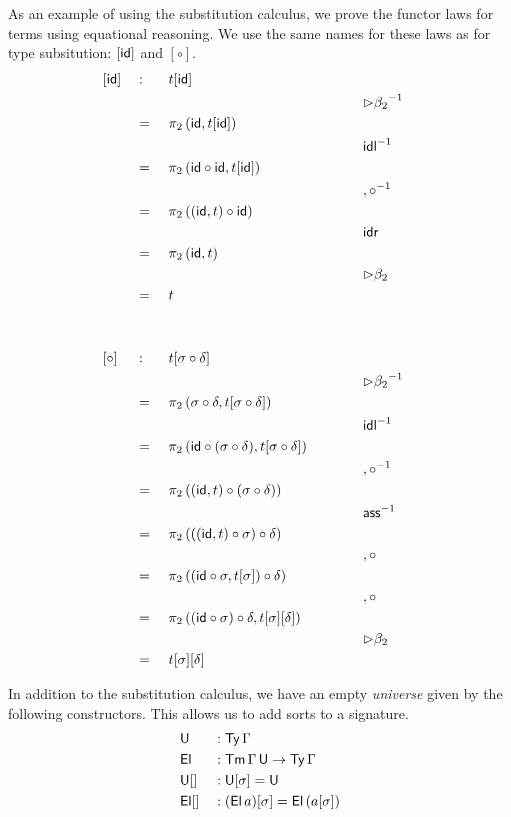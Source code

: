 \documentclass[acmsmall,screen]{acmart}
\begin{document}
As an example of using the substitution calculus, we prove the functor
laws for terms using equational reasoning. We use the same names for
these laws as for type subsitution: ${[\mathsf{id}]}$ and ${[\circ]}$.
\begin{alignat*}{15}
  & [\id] && : && t[\id] \\
  & && && && && {\rhd\beta_2}^{-1} \\
  & && = \,\, && \pi_2\,(\id, t[\id]) \\
  & && && && && {\idl}^{-1} \\
  & && = \,\, && \pi_2\,(\id\circ\id, t[\id]) \\
  & && && && && {,\circ}^{-1} \\
  & && = \,\, && \pi_2\,((\id, t)\circ\id) \\
  & && && && && \idr \\
  & && = \,\, && \pi_2\,(\id, t) \\
  & && && && && {\rhd\beta_2} \\
  & && = \,\, && t \\
  \\
  \\
  & [\circ] && : && t[\sigma\circ\delta] \\
  & && && && \hspace{2em} && {\rhd\beta_2}^{-1} \\
  & && = \,\, && \pi_2\,(\sigma\circ\delta, t[\sigma\circ\delta]) \\
  & && && && && {\idl}^{-1} \\
  & && = \,\, && \pi_2\,(\id\circ(\sigma\circ\delta), t[\sigma\circ\delta]) \\
  & && && && && {,\circ}^{-1} \\
  & && = \,\, && \pi_2\,((\id, t)\circ(\sigma\circ\delta)) \\
  & && && && && \ass^{-1} \\
  & && = \,\, && \pi_2\,(((\id, t)\circ\sigma)\circ\delta) \\
  & && && && && {,\circ} \\
  & && = \,\, && \pi_2\,((\id\circ\sigma, t[\sigma])\circ\delta) \\
  & && && && && {,\circ} \\
  & && = \,\, && \pi_2\,((\id\circ\sigma)\circ\delta, t[\sigma][\delta]) \\
  & && && && && {\rhd\beta_2} \\
  & && = \,\, && t[\sigma][\delta]
\end{alignat*}

In addition to the substitution calculus, we have an empty {\em
  universe} given by the following constructors. This allows us to add
sorts to a signature.
\begin{alignat*}{5}
  & \mathsf{U} && : \mathsf{Ty}\,\Gamma \\
  & \mathsf{El} && : \mathsf{Tm}\,\Gamma\,\mathsf{U} \rightarrow \mathsf{Ty}\,\Gamma \\
  & {\mathsf{U}[]} && : \mathsf{U}[\sigma] = \mathsf{U} \\
  & {\mathsf{El}[]} && : (\mathsf{El}\,a)[\sigma] = \mathsf{El}\,(a[\sigma])
\end{alignat*}
\end{document}
